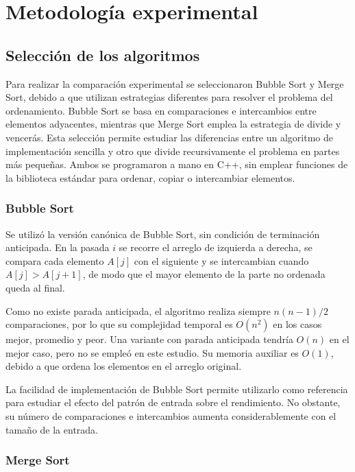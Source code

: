 \documentclass[12pt,a4paper,twocolumn]{article}
\begin{document}
\section{Metodología experimental}
 
\subsection{Selección de los algoritmos}
 
Para realizar la comparación experimental se seleccionaron
Bubble Sort y Merge Sort, debido a que utilizan estrategias
diferentes para resolver el problema del ordenamiento. Bubble
Sort se basa en comparaciones e intercambios entre elementos
adyacentes, mientras que Merge Sort emplea la estrategia de
divide y vencerás. Esta selección permite estudiar las diferencias
entre un algoritmo de implementación sencilla y otro que divide
recursivamente el problema en partes más pequeñas. Ambos se
programaron a mano en C++, sin emplear funciones de la biblioteca
estándar para ordenar, copiar o intercambiar elementos.
 
\subsubsection{Bubble Sort}
 
Se utilizó la versión canónica de Bubble Sort, sin condición de
terminación anticipada. En la pasada $i$ se recorre el arreglo de
izquierda a derecha, se compara cada elemento $A[j]$ con el
siguiente y se intercambian cuando $A[j] > A[j+1]$, de modo que el
mayor elemento de la parte no ordenada queda al final.
 
Como no existe parada anticipada, el algoritmo realiza siempre
$n(n-1)/2$ comparaciones, por lo que su complejidad temporal es
$O(n^2)$ en los casos mejor, promedio y peor. Una variante con
parada anticipada tendría $O(n)$ en el mejor caso, pero no se
empleó en este estudio. Su memoria auxiliar es $O(1)$, debido a
que ordena los elementos en el arreglo original.
 
La facilidad de implementación de Bubble Sort permite utilizarlo
como referencia para estudiar el efecto del patrón de entrada
sobre el rendimiento. No obstante, su número de comparaciones
e intercambios aumenta considerablemente con el tamaño de la
entrada.
 
\subsubsection{Merge Sort}
 
\end{document}

